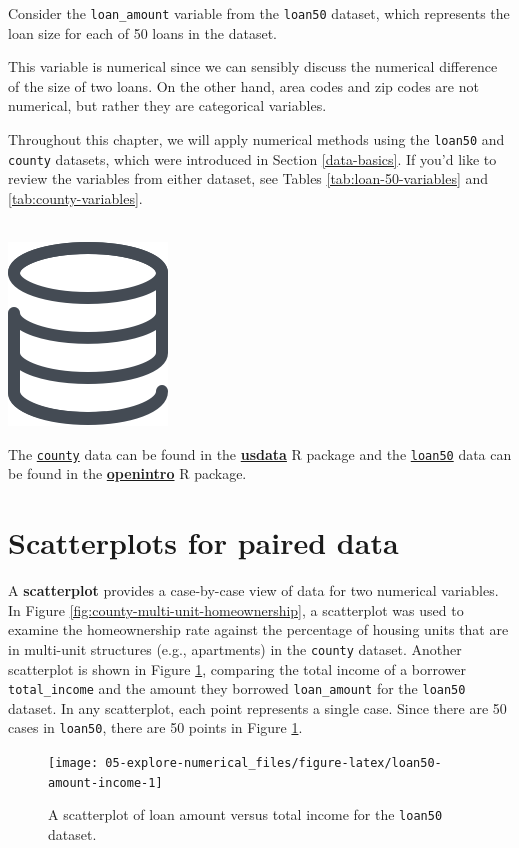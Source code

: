 \documentclass[
  10pt,
  openany]{book}
\newenvironment{mdframedwithfootTipDataPro}
{   
    \savenotes
    \begin{mdframed}[%
    topline=true, bottomline=true, linecolor=oiGray, linewidth=0.5pt,
    rightline=false, leftline=false,
    backgroundcolor=oiLGray]
    \renewcommand{\thempfootnote}{\arabic{footnote}}
    }
{
    \end{mdframed}
    \spewnotes
}
\newenvironment{data}{
\vspace{4mm}
\begin{mdframedwithfootTipDataPro}
\begin{minipage}[t]{0.10\textwidth}
{$\:$ \\ \setkeys{Gin}{width=2em,keepaspectratio}\includegraphics{images/_icons/data.png}}
\end{minipage}
\hfill
\begin{minipage}[t]{0.90\textwidth}
\vspace{-2mm}
\setlength{\parskip}{1em}
}{\end{minipage}
\end{mdframedwithfootTipDataPro}
\vspace{4mm}
}
\begin{document}
Consider the \texttt{loan\_amount} variable from the \texttt{loan50} dataset, which represents the loan size for each of 50 loans in the dataset.

This variable is numerical since we can sensibly discuss the numerical difference of the size of two loans.
On the other hand, area codes and zip codes are not numerical, but rather they are categorical variables.

Throughout this chapter, we will apply numerical methods using the \texttt{loan50} and \texttt{county} datasets, which were introduced in Section \ref{data-basics}.
If you'd like to review the variables from either dataset, see Tables \ref{tab:loan-50-variables} and \ref{tab:county-variables}.

\begin{data}
The \href{http://openintrostat.github.io/usdata/reference/county.html}{\texttt{county}} data can be found in the \href{http://openintrostat.github.io/usdata}{\textbf{usdata}} R package and the \href{http://openintrostat.github.io/openintro/reference/loan50.html}{\texttt{loan50}} data can be found in the \href{http://openintrostat.github.io/openintro}{\textbf{openintro}} R package.

\end{data}

\hypertarget{scatterplots}{%
\section{Scatterplots for paired data}\label{scatterplots}}

A \textbf{scatterplot} provides a case-by-case view of data for two numerical variables.
In Figure \ref{fig:county-multi-unit-homeownership}, a scatterplot was used to examine the homeownership rate against the percentage of housing units that are in multi-unit structures (e.g., apartments) in the \texttt{county} dataset.
Another scatterplot is shown in Figure \ref{fig:loan50-amount-income}, comparing the total income of a borrower \texttt{total\_income} and the amount they borrowed \texttt{loan\_amount} for the \texttt{loan50} dataset.
In any scatterplot, each point represents a single case.
Since there are 50 cases in \texttt{loan50}, there are 50 points in Figure \ref{fig:loan50-amount-income}.

\begin{figure}[h]

{\centering \texttt{[image: 05-explore-numerical\_files/figure-latex/loan50-amount-income-1]} 

}

\caption{A scatterplot of loan amount versus total income for the \texttt{loan50} dataset.}\label{fig:loan50-amount-income}
\end{figure}
\end{document}
